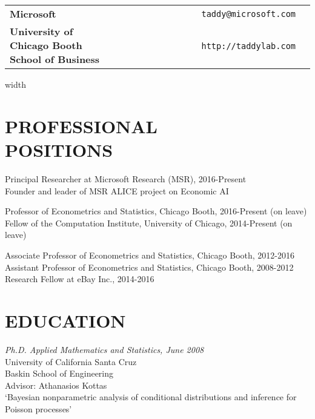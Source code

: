 \documentclass[margin,line]{res}
\begin{document}

\begin{resume}

\medskip
\section{} 
\vspace{.05in}
\begin{tabular}{@{}p{3in}rp{2in}}
{\bf Microsoft} & {\tt taddy@microsoft.com}\\
{\bf University of Chicago Booth School of Business} & ~~~~~~~~~~~~~~~~~{\tt http://taddylab.com}
\end{tabular}



\vspace{.5cm}
\leaders\vrule width \textwidth\vskip0.4pt

\medskip
\section{\bf PROFESSIONAL\\ POSITIONS}

Principal Researcher at Microsoft Research (MSR), 2016-Present\\
Founder and leader of MSR ALICE project on Economic AI

\vspace{-.2cm}
Professor of Econometrics and Statistics, Chicago Booth,
2016-Present (on leave)\\
Fellow of the Computation Institute, University of Chicago, 2014-Present (on leave)

\vspace{-.2cm}
Associate Professor of Econometrics and Statistics, Chicago Booth,
2012-2016\\
Assistant Professor of Econometrics and Statistics, Chicago Booth,
2008-2012\\
Research Fellow at eBay Inc., 2014-2016

\medskip
\section{\bf EDUCATION}

{\it Ph.D. Applied Mathematics and Statistics, June 2008}\\
{\sc University of California Santa Cruz}\\
Baskin School of Engineering\\
Advisor: Athanasios Kottas\\
`Bayesian nonparametric analysis of conditional distributions and inference for Poisson processes'


\end{resume}
\end{document}
